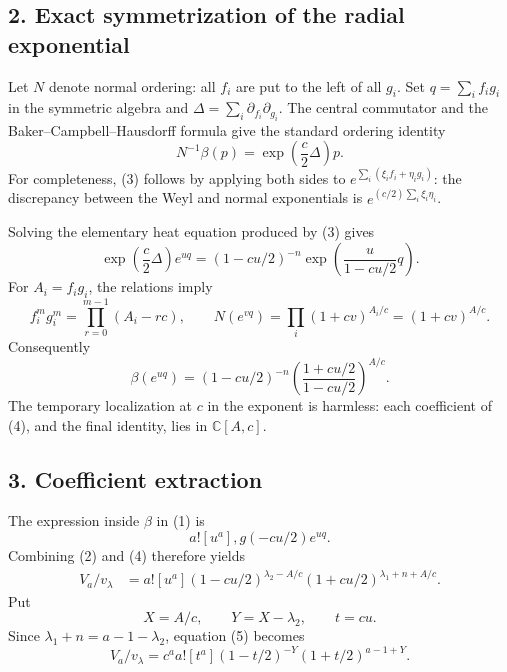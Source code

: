 \documentclass[11pt]{article}
\begin{document}
\subsection*{2. Exact symmetrization of the radial exponential}

Let $N$ denote normal ordering: all $f_i$ are put to the left of all $g_i$.
Set $q=\sum_i f_i g_i$ in the symmetric algebra and
$\Delta=\sum_i\partial_{f_i}\partial_{g_i}$.  The central commutator and the
Baker--Campbell--Hausdorff formula give the standard ordering identity
\begin{equation}
 N^{-1}\beta(p)=\exp\left(\frac c2\Delta\right)p.                       \tag{3}
\end{equation}
For completeness, (3) follows by applying both sides to
$e^{\sum_i(\xi_i f_i+\eta_i g_i)}$: the discrepancy between the Weyl and
normal exponentials is $e^{(c/2)\sum_i\xi_i\eta_i}$.

Solving the elementary heat equation produced by (3) gives
\[
 \exp\left(\frac c2\Delta\right)e^{uq}
 =(1-cu/2)^{-n}\exp\left(\frac{u}{1-cu/2}q\right).
\]
For $A_i=f_i g_i$, the relations imply
\[
 f_i^m g_i^m=\prod_{r=0}^{m-1}(A_i-rc),
 \qquad
 N(e^{vq})=\prod_i(1+cv)^{A_i/c}=(1+cv)^{A/c}.
\]
Consequently
\begin{equation}
 \boxed{\displaystyle
 \beta(e^{uq})=(1-cu/2)^{-n}
 \left(\frac{1+cu/2}{1-cu/2}\right)^{A/c}.}                            \tag{4}
\end{equation}
The temporary localization at $c$ in the exponent is harmless: each
coefficient of (4), and the final identity, lies in $\mathbb C[A,c]$.

\subsection*{3. Coefficient extraction}

The expression inside $\beta$ in (1) is
\[
 a![u^a],g(-cu/2)e^{uq}.
\]
Combining (2) and (4) therefore yields
\begin{align}
 V_a/v_\lambda
 &=a![u^a]
   (1-cu/2)^{\lambda_2-A/c}
   (1+cu/2)^{\lambda_1+n+A/c}.                                        \tag{5}
\end{align}
Put
\[
 X=A/c,\qquad Y=X-\lambda_2,\qquad t=cu.
\]
Since $\lambda_1+n=a-1-\lambda_2$, equation (5) becomes
\begin{equation}
 V_a/v_\lambda
 =c^a a![t^a](1-t/2)^{-Y}(1+t/2)^{a-1+Y}.                              \tag{6}
\end{equation}
\end{document}
